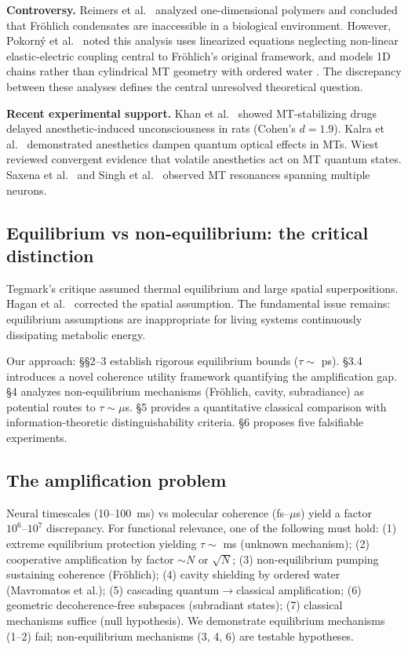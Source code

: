 \documentclass[twocolumn,10pt]{article}
\begin{document}
\textbf{Controversy.} Reimers et al.\ \cite{Reimers2009} analyzed
one-dimensional polymers and concluded that Fr\"ohlich condensates are
inaccessible in a biological environment. However, Pokorn\'y et al.\
\cite{Pokorn2011} noted this analysis uses linearized equations neglecting
non-linear elastic-electric coupling central to Fr\"ohlich's original
framework, and models 1D chains rather than cylindrical MT geometry with
ordered water \cite{Mavromatos2025,Salari2011}. The discrepancy between
these analyses defines the central unresolved theoretical question.

\textbf{Recent experimental support.} Khan et al.\ \cite{Khan2024} showed
MT-stabilizing drugs delayed anesthetic-induced unconsciousness in rats
(Cohen's $d = 1.9$). Kalra et al.\ \cite{Kalra2023} demonstrated anesthetics
dampen quantum optical effects in MTs. Wiest \cite{Wiest2025} reviewed
convergent evidence that volatile anesthetics act on MT quantum states.
Saxena et al.\ \cite{Saxena2020} and Singh et al.\ \cite{Singh2021}
observed MT resonances spanning multiple neurons.


\subsection{Equilibrium vs non-equilibrium: the critical distinction}

Tegmark's critique \cite{Tegmark2000} assumed thermal equilibrium and large
spatial superpositions. Hagan et al.\ \cite{Hagan2002} corrected the spatial
assumption. The fundamental issue remains: equilibrium assumptions are
inappropriate for living systems continuously dissipating metabolic energy.

Our approach: \S\S 2--3 establish rigorous equilibrium bounds
($\tau \sim$ ps). \S 3.4 introduces a novel coherence utility framework
quantifying the amplification gap. \S 4 analyzes non-equilibrium mechanisms
(Fr\"ohlich, cavity, subradiance) as potential routes to $\tau \sim \mu$s.
\S 5 provides a quantitative classical comparison with information-theoretic
distinguishability criteria. \S 6 proposes five falsifiable experiments.


\subsection{The amplification problem}

Neural timescales (10--100~ms) vs molecular coherence (fs--$\mu$s) yield a
factor $10^6\text{--}10^7$ discrepancy. For functional relevance, one of the
following must hold: (1) extreme equilibrium protection yielding
$\tau \sim$ ms (unknown mechanism); (2) cooperative amplification by factor
$\sim N$ or $\sqrt{N}$; (3) non-equilibrium pumping sustaining coherence
(Fr\"ohlich); (4) cavity shielding by ordered water (Mavromatos et al.);
(5) cascading quantum$\to$classical amplification; (6) geometric
decoherence-free subspaces (subradiant states); (7) classical mechanisms
suffice (null hypothesis). We demonstrate equilibrium mechanisms (1--2)
fail; non-equilibrium mechanisms (3, 4, 6) are testable hypotheses.
\end{document}
